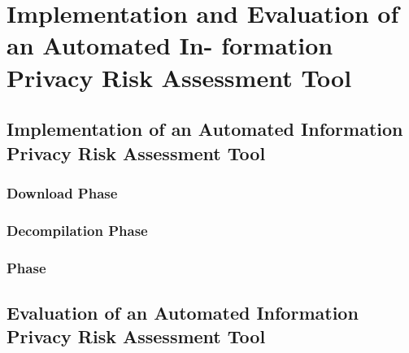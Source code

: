 \section{Implementation and Evaluation of an Automated In- formation Privacy Risk Assessment Tool}

\subsection{Implementation of an Automated Information Privacy Risk Assessment Tool}

\subsubsection{Download Phase}

\subsubsection{Decompilation Phase}

\subsubsection{\Sca Phase}

\subsection{Evaluation of an Automated Information Privacy Risk Assessment Tool}